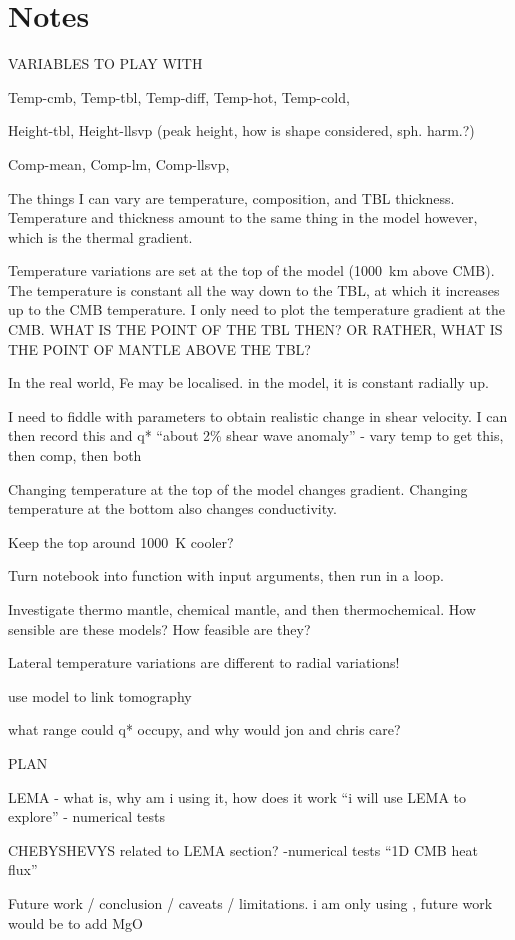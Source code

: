 \section{Notes}

VARIABLES TO PLAY WITH

Temp-cmb,
Temp-tbl,
Temp-diff,
Temp-hot,
Temp-cold,

Height-tbl,
Height-llsvp (peak height, how is shape considered, sph. harm.?)

Comp-mean,
Comp-lm,
Comp-llsvp,


The things I can vary are temperature, composition, and TBL thickness. Temperature and thickness amount to the same thing in the model however, which is the thermal gradient.

Temperature variations are set at the top of the model (1000~km above CMB). The temperature is constant all the way down to the TBL, at which it increases up to the CMB temperature. I only need to plot the temperature gradient at the CMB. WHAT IS THE POINT OF THE TBL THEN? OR RATHER, WHAT IS THE POINT OF MANTLE ABOVE THE TBL?

In the real world, Fe may be localised. in the model, it is constant radially up. 

I need to fiddle with parameters to obtain realistic change in shear velocity. I can then record this and q* ``about 2\% shear wave anomaly'' - vary temp to get this, then comp, then both

Changing temperature at the top of the model changes gradient. Changing temperature at the bottom also changes conductivity.

Keep the top around 1000~K cooler?

Turn notebook into function with input arguments, then run in a loop.

Investigate thermo mantle, chemical mantle, and then thermochemical. How sensible are these models? How feasible are they?

Lateral temperature variations are different to radial variations!

use model to link tomography

what range could q* occupy, and why would jon and chris care?




PLAN


LEMA - what is, why am i using it, how does it work ``i will use LEMA to explore'' - numerical tests

CHEBYSHEVYS related to LEMA section? -numerical tests ``1D CMB heat flux''

Future work / conclusion / caveats / limitations. i am only using \bdg, future work would be to add MgO















